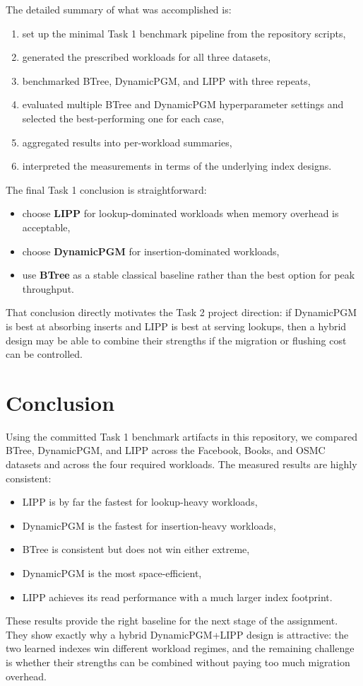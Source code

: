 \documentclass[11pt]{article}
\begin{document}
The detailed summary of what was accomplished is:
\begin{enumerate}[leftmargin=1.5em]
    \item set up the minimal Task 1 benchmark pipeline from the repository scripts,
    \item generated the prescribed workloads for all three datasets,
    \item benchmarked BTree, DynamicPGM, and LIPP with three repeats,
    \item evaluated multiple BTree and DynamicPGM hyperparameter settings and selected
    the best-performing one for each case,
    \item aggregated results into per-workload summaries,
    \item interpreted the measurements in terms of the underlying index designs.
\end{enumerate}

The final Task 1 conclusion is straightforward:
\begin{itemize}[leftmargin=1.5em]
    \item choose \textbf{LIPP} for lookup-dominated workloads when memory overhead is
    acceptable,
    \item choose \textbf{DynamicPGM} for insertion-dominated workloads,
    \item use \textbf{BTree} as a stable classical baseline rather than the best option
    for peak throughput.
\end{itemize}

That conclusion directly motivates the Task 2 project direction: if DynamicPGM is best at
absorbing inserts and LIPP is best at serving lookups, then a hybrid design may be able
to combine their strengths if the migration or flushing cost can be controlled.

\section{Conclusion}

Using the committed Task 1 benchmark artifacts in this repository, we compared BTree,
DynamicPGM, and LIPP across the Facebook, Books, and OSMC datasets and across the four
required workloads. The measured results are highly consistent:
\begin{itemize}[leftmargin=1.5em]
    \item LIPP is by far the fastest for lookup-heavy workloads,
    \item DynamicPGM is the fastest for insertion-heavy workloads,
    \item BTree is consistent but does not win either extreme,
    \item DynamicPGM is the most space-efficient,
    \item LIPP achieves its read performance with a much larger index footprint.
\end{itemize}

These results provide the right baseline for the next stage of the assignment. They show
exactly why a hybrid DynamicPGM+LIPP design is attractive: the two learned indexes win
different workload regimes, and the remaining challenge is whether their strengths can be
combined without paying too much migration overhead.
\end{document}
